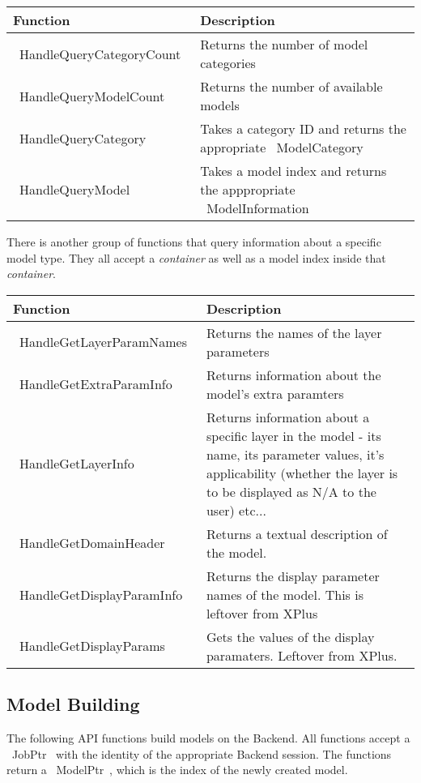 \documentclass[12pt]{article}
\begin{document}
\begin{center}
	\begin{tabular}{|l|p{7.5cm}|}
		\hline
		\textbf{Function} & \textbf{Description} \\ \hline
		~HandleQueryCategoryCount~ & Returns the number of model categories \\ \hline
		~HandleQueryModelCount~ & Returns the number of available models \\ \hline
		~HandleQueryCategory~ & Takes a category ID and returns the appropriate ~ModelCategory~ \\ \hline
		~HandleQueryModel~ & Takes a model index and returns the apppropriate ~ModelInformation~ \\ \hline 
	\end{tabular}
\end{center}

There is another group of functions that query information about a specific model type. They all accept a \emph{container} as well as a model index inside that \emph{container}.

\begin{center}
	\begin{tabular}{|l|p{7.5cm}|}
		\hline
		\textbf{Function} & \textbf{Description} \\ \hline
		~HandleGetLayerParamNames~ & Returns the names of the layer parameters \\ \hline
		~HandleGetExtraParamInfo~ & Returns information about the model's extra paramters \\ \hline
		~HandleGetLayerInfo~ & Returns information about a specific layer in the model - its name, its parameter values, it's applicability (whether the layer is to be displayed as N/A to the user) etc...  \\ \hline
		~HandleGetDomainHeader~ & Returns a textual description of the model. \\ \hline
		~HandleGetDisplayParamInfo~ & Returns the display parameter names of the model. This is leftover from XPlus \\ \hline
		~HandleGetDisplayParams~ & Gets the values of the display paramaters. Leftover from XPlus. \\ \hline
	\end{tabular}
\end{center}

\subsection{Model Building}
The following API functions build models on the Backend. All functions accept a ~JobPtr~ with the identity of the appropriate Backend session. The functions return a ~ModelPtr~, which is the index of the newly created model.
\end{document}
